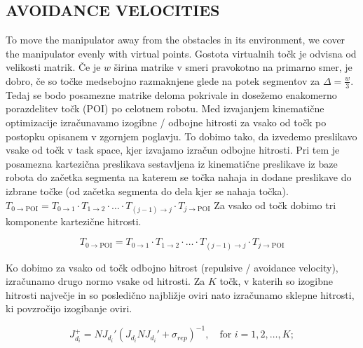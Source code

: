 \documentclass[letterpaper, 10 pt, conference]{ieeeconf}  %
\begin{document}
\subsection{AVOIDANCE VELOCITIES}

To move the manipulator away from the obstacles in its environment, we cover the manipulator evenly with virtual points. Gostota virtualnih točk je odvisna od velikosti matrik. Če je $w$ širina matrike v smeri pravokotno na primarno smer, je dobro, če so točke medsebojno razmaknjene glede na potek segmentov za $\Delta = \frac{w}{3}$. Tedaj se bodo posamezne matrike deloma pokrivale in dosežemo enakomerno porazdelitev točk (POI) po celotnem robotu. Med izvajanjem kinematične optimizacije izračunavamo izogibne / odbojne hitrosti za vsako od točk po postopku opisanem v zgornjem poglavju.  To dobimo tako, da izvedemo preslikavo vsake od točk v task space, kjer izvajamo izračun odbojne hitrosti. Pri tem je posamezna kartezična preslikava sestavljena iz kinematične preslikave iz baze robota do začetka segmenta na katerem se točka nahaja in dodane preslikave do izbrane točke (od začetka segmenta do dela kjer se nahaja točka). \(T_{0 \rightarrow \text{POI}} = T_{0 \rightarrow 1} \cdot T_{1 \rightarrow 2} \cdot \ldots \cdot T_{(j-1) \rightarrow j} \cdot T_{j \rightarrow \text{POI}}\) Za vsako od točk dobimo tri komponente kartezične hitrosti. 

\begin{equation}
	T_{0 \rightarrow \text{POI}} = T_{0 \rightarrow 1} \cdot T_{1 \rightarrow 2} \cdot \ldots \cdot T_{(j-1) \rightarrow j} \cdot T_{j \rightarrow \text{POI}}	
\end{equation}

Ko dobimo za vsako od točk odbojno hitrost (repulsive / avoidance velocity), izračunamo drugo normo vsake od hitrosti. Za $K$ točk, v katerih so izogibne hitrosti največje in so posledično najbližje oviri nato izračunamo sklepne hitrosti, ki povzročijo izogibanje oviri. 


\begin{equation}
	J_{d_i}^{+} = N J_{d_i}' (J_{d_i} N J_{d_i}' + \sigma_{rep})^{-1}, \quad \text{for } i = 1, 2, \ldots, K;
\end{equation}
\end{document}
